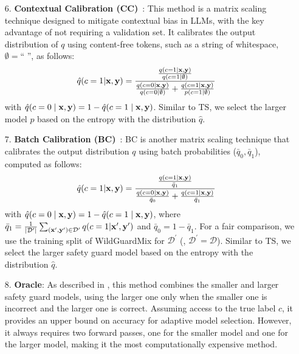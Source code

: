 \begin{enumerate}[leftmargin=0in, topsep=5pt, leftmargin=*]
\vspace{-0.05in}
\item[6.] \textbf{Contextual Calibration (CC)}~\cite{zhao2021calibrate}: This method is a matrix scaling technique designed to mitigate contextual bias in LLMs, with the key advantage of not requiring a validation set. It calibrates the output distribution of $q$ using content-free tokens, such as a string of whitespace, $\emptyset=\text{`` ''}$, as follows:
\begin{align*}
\hat{q}(c=1|{\mathbf{x}},{\mathbf{y}}) &= \frac{\frac{q(c=1|{\mathbf{x}},{\mathbf{y}})}{q(c=1|\emptyset)}}{\frac{q(c=0|{\mathbf{x}},{\mathbf{y}})}{q(c=0|\emptyset)}+\frac{q(c=1|{\mathbf{x}},{\mathbf{y}})}{p(c=1|\emptyset)}}
\end{align*}
with $\hat{q}(c=0\mid {\mathbf{x}}, {\mathbf{y}})=1-\hat{q}(c=1\mid {\mathbf{x}}, {\mathbf{y}})$. Similar to TS, we select the larger model $p$ based on the entropy with the distribution $\hat{q}$.

\vspace{-0.05in}
\item[7.] \textbf{Batch Calibration (BC)}~\cite{zhou2023batch}: 
BC is another matrix scaling technique that calibrates the output distribution $q$ using batch probabilities ($\bar{q}_0, \bar{q}_1$), computed as follows:
\begin{align*}
\hat{q}(c=1|{\mathbf{x}},{\mathbf{y}}) &= \frac{\frac{q(c=1|{\mathbf{x}}, {\mathbf{y}})}{\bar{q}_1}}{\frac{q(c=0|{\mathbf{x}}, {\mathbf{y}})}{\bar{q}_0}+\frac{q(c=1|{\mathbf{x}}, {\mathbf{y}})}{\bar{q}_1}}
\end{align*}
with $\hat{q}(c=0\mid {\mathbf{x}}, {\mathbf{y}})=1-\hat{q}(c=1\mid {\mathbf{x}}, {\mathbf{y}})$, where $\bar{q}_1 = \frac{1}{|\mathcal{D}^\prime|} \sum_{({\mathbf{x}}^\prime,{\mathbf{y}}^\prime)\in\mathcal{D}^\prime} q(c=1|{\mathbf{x}}', {\mathbf{y}}')$ and $\bar{q}_0 = 1-\bar{q}_1$. 
For a fair comparison, we use the training split of WildGuardMix for $\mathcal{D}^\prime$ (\ie, $\mathcal{D}^\prime = \mathcal{D}$). Similar to TS, we select the larger safety guard model based on the entropy with the distribution $\hat{q}$.

\vspace{-0.05in}
\item[8.] \textbf{Oracle}: As described in , this method combines the smaller and larger safety guard models, using the larger one only when the smaller one is incorrect and the larger one is correct. Assuming access to the true label $c$, it provides an upper bound on accuracy for adaptive model selection. However, it always requires two forward passes, one for the smaller model and one for the larger model, making it the most computationally expensive method.

\end{enumerate}




